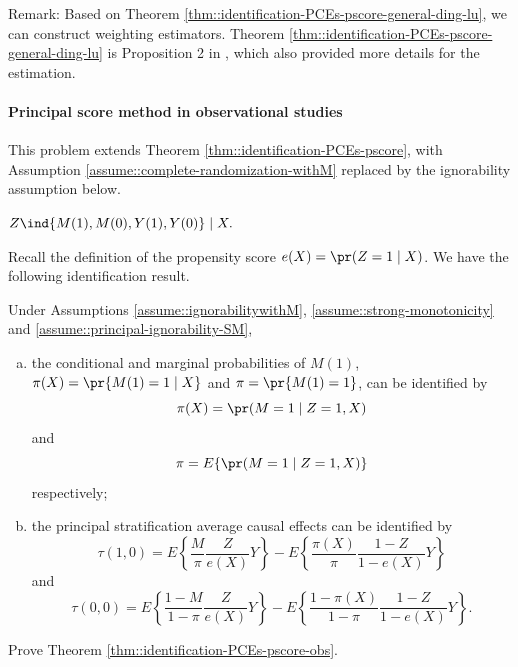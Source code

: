 Remark:
Based on Theorem \ref{thm::identification-PCEs-pscore-general-ding-lu}, we can construct weighting estimators. Theorem \ref{thm::identification-PCEs-pscore-general-ding-lu} is Proposition 2 in \citet{ding2017principal}, which also provided more details for the estimation. 



\paragraph{Principal score method in observational studies}
\label{hw::principalscore-observational}

This problem extends Theorem \ref{thm::identification-PCEs-pscore}, with Assumption \ref{assume::complete-randomization-withM} replaced by the ignorability assumption below.


\begin{assumption}
\label{assume::ignorabilitywithM}
$
Z\ind \{ M(1), M(0), Y(1) , Y(0) \} \mid X.
$
\end{assumption}

Recall the definition of the propensity score $e(X) = \pr(Z=1\mid X)$. 
We have the following identification result. 


\begin{theorem}
\label{thm::identification-PCEs-pscore-obs}
Under Assumptions \ref{assume::ignorabilitywithM}, \ref{assume::strong-monotonicity} and \ref{assume::principal-ignorability-SM}, 
\begin{enumerate}
[(a)]
\item 
the conditional and marginal probabilities of $M(1)$, 
$\pi(X) =  \pr\{ M(1)=1\mid X \}  $ and $\pi =  \pr\{ M(1)=1\} $, can be identified by
$$
\pi(X)   =  \pr(M=1\mid Z=1, X ) 
$$ 
and 
$$
\pi  =  E\{\pr(M=1\mid Z=1, X ) \}
$$ 
respectively; 
\item
the principal  stratification average causal effects can be identified by 
$$
\tau(1,0) = E\left\{   \frac{M}{\pi}   \frac{Z}{e(X)} Y \right\}
- E\left\{   \frac{ \pi(X)  }{\pi}   \frac{1-Z}{1-e(X)} Y    \right\} 
$$
and
$$
\tau(0,0) = E\left\{   \frac{1-M}{1-\pi}   \frac{Z}{e(X)} Y \right\}
- E\left\{   \frac{ 1- \pi(X)  }{1 - \pi}   \frac{1-Z}{1-e(X)} Y    \right\} .
$$
\end{enumerate}
\end{theorem}


Prove Theorem \ref{thm::identification-PCEs-pscore-obs}. 


 


